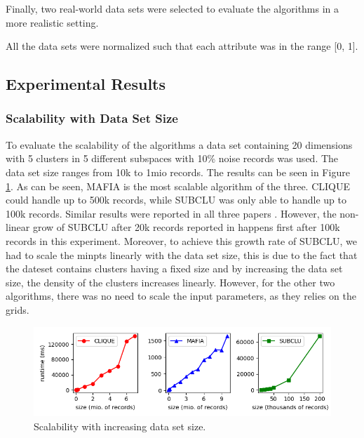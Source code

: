 Finally, two real-world data sets were selected to evaluate the algorithms in a more realistic setting.

All the data sets were normalized such that each attribute was in the range [0, 1].

\subsection{Experimental Results}

\subsubsection{Scalability with Data Set Size}
To evaluate the scalability of the algorithms a data set containing 20 dimensions with 5 clusters in 5 different subspaces with 10\% noise records was used. The data set size ranges from 10k to 1mio records. The results can be seen in Figure \ref{fig:dataset_size_vs_runtime}. As can be seen, MAFIA is the most scalable algorithm of the three. CLIQUE could handle up to 500k records, while SUBCLU was only able to handle up to 100k records. Similar results were reported in all three papers \cite{mafia,clique,subclu}. However, the non-linear grow of SUBCLU after 20k records reported in \cite{subclu} happens first after 100k records in this experiment. Moreover, to achieve this growth rate of SUBCLU, we had to scale the minpts linearly with the data set size, this is due to the fact that the dateset contains clusters having a fixed size and by increasing the data set size, the density of the clusters increases linearly. However, for the other two algorithms, there was no need to scale the input parameters, as they relies on the grids.
\begin{figure}[H]
    \vspace*{-0.5cm}
    \centering
    \includegraphics[scale=0.45]{figures/dataset_size_vs_runtime.png}
    \caption{Scalability with increasing data set size.}
    \label{fig:dataset_size_vs_runtime}
    \vspace*{-0.5cm}
\end{figure}


